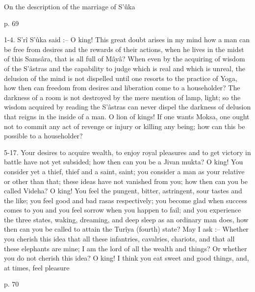 On the description of the marriage of S’ûka

 

p. 69

 

1-4. S’rî S’ûka said :-- O king! This great doubt arises in my mind how a man can be free from desires and the rewards of their actions, when he lives in the midst of this Samsâra, that is all full of Mâyâ? When even by the acquiring of wisdom of the S’âstras and the capability to judge which is real and which is unreal, the delusion of the mind is not dispelled until one resorts to the practice of Yoga, how then can freedom from desires and liberation come to a householder? The darkness of a room is not destroyed by the mere mention of lamp, light; so the wisdom acquired by reading the S’âstras can never dispel the darkness of delusion that reigns in the inside of a man. O lion of kings! If one wants Moksa, one ought not to commit any act of revenge or injury or killing any being; how can this be possible to a householder?

 

5-17. Your desires to acquire wealth, to enjoy royal pleasures and to get victory in battle have not yet subsided; how then can you be a Jivan mukta? O king! You consider yet a thief, thief and a saint, saint; you consider a man as your relative or other than that; these ideas have not vanished from you; how then can you be called Videha? O king! You feel the pungent, bitter, astringent, sour tastes and the like; you feel good and bad rasas respectively; you become glad when success comes to you and you feel sorrow when you happen to fail; and you experience the three states, waking, dreaming, and deep sleep as an ordinary man does, how then can you be called to attain the Turîya (fourth) state? May I ask :-- Whether you cherish this idea that all these infantries, cavalries, chariots, and that all these elephants are mine; I am the lord of all the wealth and things? Or whether you do not cherish this idea? O king! I think you eat sweet and good things, and, at times, feel pleasure

 

p. 70

 

